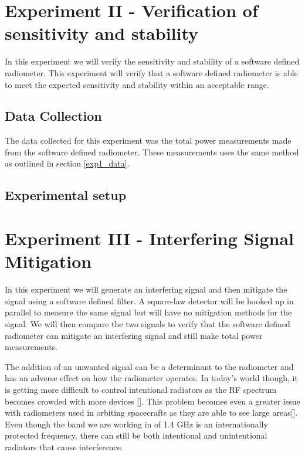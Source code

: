 \section{Experiment II - Verification of sensitivity and stability}\label{Exp2}

In this experiment we will verify the sensitivity and stability of a software defined radiometer.  This experiment will verify that a software defined radiometer is able to meet the expected sensitivity and stability within an acceptable range.    

\subsection{Data Collection}
The data collected for this experiment was the total power measurements made from the software defined radiometer.  These measurements uses the same method as outlined in section \ref{exp1_data}.

\subsection{Experimental setup} \label{exp2_setup}


\section{Experiment III - Interfering Signal Mitigation}\label{Exp3}

In this experiment we will generate an interfering signal and then mitigate the signal using a software defined filter.  A square-law detector will be hooked up in parallel to measure the same signal but will have no mitigation methods for the signal.  We will then compare the two signals to verify that the software defined radiometer can mitigate an interfering signal and still make total power measurements.

The addition of an unwanted signal can be a determinant to the radiometer and has an adverse effect on how the radiometer operates.  In today's world though, it is getting more difficult to control intentional radiators as the RF spectrum becomes crowded with more devices [\cite{Ellingson}].  This problem becomes even a greater issue with radiometers used in orbiting spacecrafts as they are able to see large areas[\cite{DeRooRFI}].  Even though the band we are working in of 1.4 GHz is an internationally protected frequency, there can still be both intentional and unintentional radiators that cause interference.


